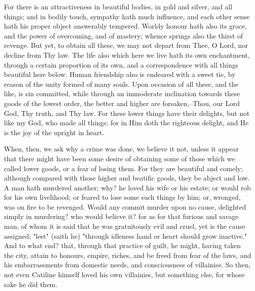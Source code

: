 \documentclass[b5paper,openright,12pt,twoside]{book}
\begin{document}
For there is an attractiveness in beautiful bodies, in gold and silver,
and all things; and in bodily touch, sympathy hath much influence, and
each other sense hath his proper object answerably tempered. Worldy
honour hath also its grace, and the power of overcoming, and of mastery;
whence springs also the thirst of revenge. But yet, to obtain all these,
we may not depart from Thee, O Lord, nor decline from Thy law. The life
also which here we live hath its own enchantment, through a certain
proportion of its own, and a correspondence with all things beautiful
here below. Human friendship also is endeared with a sweet tie, by
reason of the unity formed of many souls. Upon occasion of all these,
and the like, is sin committed, while through an immoderate inclination
towards these goods of the lowest order, the better and higher are
forsaken,--Thou, our Lord God, Thy truth, and Thy law. For these lower
things have their delights, but not like my God, who made all things;
for in Him doth the righteous delight, and He is the joy of the upright
in heart.

When, then, we ask why a crime was done, we believe it not, unless it
appear that there might have been some desire of obtaining some of those
which we called lower goods, or a fear of losing them. For they are
beautiful and comely; although compared with those higher and beatific
goods, they be abject and low. A man hath murdered another; why? he
loved his wife or his estate; or would rob for his own livelihood; or
feared to lose some such things by him; or, wronged, was on fire to be
revenged. Would any commit murder upon no cause, delighted simply in
murdering? who would believe it? for as for that furious and savage man,
of whom it is said that he was gratuitously evil and cruel, yet is the
cause assigned; "lest" (saith he) "through idleness hand or heart should
grow inactive." And to what end? that, through that practice of guilt,
he might, having taken the city, attain to honours, empire, riches, and
be freed from fear of the laws, and his embarrassments from domestic
needs, and consciousness of villainies. So then, not even Catiline
himself loved his own villainies, but something else, for whose sake he
did them.
\end{document}
